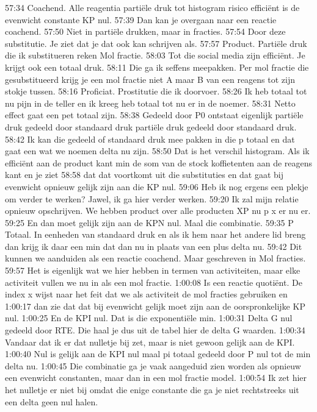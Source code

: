 57:34
Coachend. Alle reagentia partiële druk tot histogram risico efficiënt is de evenwicht constante KP nul.
57:39
Dan kan je overgaan naar een reactie coachend.
57:50
Niet in partiële drukken, maar in fracties.
57:54
Door deze substitutie. Je ziet dat je dat ook kan schrijven als.
57:57
Product. Partiële druk die ik substitueren reken Mol fractie.
58:03
Tot die social media zijn efficiënt. Je krijgt ook een totaal druk.
58:11
Die ga ik seffens meepakken. Per mol fractie die gesubstitueerd krijg je een mol fractie niet A maar B van een reagens tot zijn stokje tussen.
58:16
Proficiat. Prostitutie die ik doorvoer.
58:26
Ik heb totaal tot nu pijn in de teller en ik kreeg heb totaal tot nu er in de noemer.
58:31
Netto effect gaat een pet totaal zijn.
58:38
Gedeeld door P0 ontstaat eigenlijk partiële druk gedeeld door standaard druk partiële druk gedeeld door standaard druk.
58:42
Ik kan die gedeeld of standaard druk mee pakken in die p totaal en dat gaat een wat we noemen delta nu zijn.
58:50
Dat is het verschil histogram. Als ik efficiënt aan de product kant min de som van de stock koffietenten aan de reagens kant en je ziet
58:58
dat dat voortkomt uit die substituties en dat gaat bij evenwicht opnieuw gelijk zijn aan die KP nul.
59:06
Heb ik nog ergens een plekje om verder te werken? Jawel, ik ga hier verder werken.
59:20
Ik zal mijn relatie opnieuw opschrijven. We hebben product over alle producten XP nu p x er nu er.
59:25
En dan moet gelijk zijn aan de KPN nul. Maal die combinatie.
59:35
P Totaal. In eenheden van standaard druk en als ik hem naar het andere lid breng dan krijg ik daar een min dat dan nu in plaats van een plus delta nu.
59:42
Dit kunnen we aanduiden als een reactie coachend. Maar geschreven in Mol fracties.
59:57
Het is eigenlijk wat we hier hebben in termen van activiteiten, maar elke activiteit vullen we nu in als een mol fractie.
1:00:08
Is een reactie quotiënt. De index x wijst naar het feit dat we als activiteit de mol fracties gebruiken en
1:00:17
dan zie dat dat bij evenwicht gelijk moet zijn aan de oorspronkelijke KP nul.
1:00:25
En de KPI nul. Dat is die exponentiële min.
1:00:31
Delta G nul gedeeld door RTE. Die haal je dus uit de tabel hier de delta G waarden.
1:00:34
Vandaar dat ik er dat nulletje bij zet, maar is niet gewoon gelijk aan de KPI.
1:00:40
Nul is gelijk aan de KPI nul maal pi totaal gedeeld door P nul tot de min delta nu.
1:00:45
Die combinatie ga je vaak aangeduid zien worden als opnieuw een evenwicht constanten, maar dan in een mol fractie model.
1:00:54
Ik zet hier het nulletje er niet bij omdat die enige constante die ga je niet rechtstreeks uit een delta geen nul halen.
